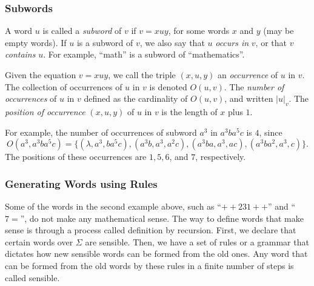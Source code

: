 \documentclass[12pt]{article}
\begin{document}
\subsubsection*{Subwords}

A word $u$ is called a \emph{subword} of $v$ if $v=xuy$, for some words $x$ and $y$ (may be empty words).  If $u$ is a subword of $v$, we also say that $u$ \emph{occurs in} $v$, or that $v$ \emph{contains} $u$.  For example, ``math'' is a subword of ``mathematics''.  

Given the equation $v=xuy$, we call the triple $(x,u,y)$ an \emph{occurrence} of $u$ in $v$.  The collection of occurrences of $u$ in $v$ is denoted $O(u,v)$.  The \emph{number of occurrences} of $u$ in $v$ defined as the cardinality of $O(u,v)$, and written $|u|_v$.  The \emph{position of occurrence} $(x,u,y)$ of $u$ in $v$ is the length of $x$ plus $1$.

For example, the number of occurrences of subword $a^3$ in $a^3ba^5c$ is $4$, since $$O(a^3,a^3ba^5c)=\lbrace (\lambda,a^3,ba^5c),(a^3b,a^3,a^2c), (a^3ba, a^3, ac), (a^3ba^2,a^3,c)\rbrace.$$  The positions of these occurrences are $1,5,6$, and $7$, respectively.

\subsubsection*{Generating Words using Rules}

Some of the words in the second example above, such as ``$++231++$'' and ``$7=$'', do not make any mathematical sense.  The way to define words that make sense is through a process called definition by recursion.  First, we declare that certain words over $\Sigma$ are sensible.  Then, we have a set of rules or a grammar that dictates how new sensible words can be formed from the old ones.  Any word that can be formed from the old words by these rules in a finite number of steps is called sensible.  
\end{document}
